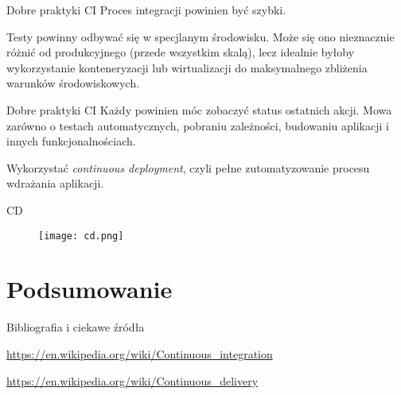 \begin{frame}{Dobre praktyki CI}
	Proces integracji powinien być szybki.
	
	Testy powinny odbywać się w specjlanym środowisku. Może się ono nieznacznie różnić od produkcyjnego (przede wszystkim skalą), lecz idealnie byłoby wykorzystanie konteneryzacji lub wirtualizacji do maksymalnego zbliżenia warunków środowiskowych.
\end{frame}

\begin{frame}{Dobre praktyki CI}
	Każdy powinien móc zobaczyć status ostatnich akcji. Mowa zarówno o testach automatycznych, pobraniu zależności, budowaniu aplikacji i innych funkcjonalnościach.
	
	Wykorzystać \emph{continuous deployment}, czyli pełne zutomatyzowanie procesu wdrażania aplikacji. 
\end{frame}

\begin{frame}{CD}
	\begin{figure}[t]
		\centering
		\texttt{[image: cd.png]}
	\end{figure}
\end{frame}

\section{Podsumowanie}

\begin{frame}{Bibliografia i ciekawe źródła}
  
	\begin{thebibliography}{9}
		
		\url{https://en.wikipedia.org/wiki/Continuous_integration}
		
		\url{https://en.wikipedia.org/wiki/Continuous_delivery}
		
	\end{thebibliography}

\end{frame}

